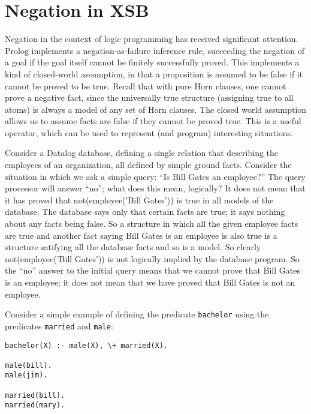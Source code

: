 \chapter{Negation in XSB}

Negation in the context of logic programming has received significant
attention.  Prolog implements a negation-as-failure inference rule,
succeeding the negation of a goal if the goal itself cannot be
finitely successfully proved.  This implements a kind of closed-world
assumption, in that a proposition is assumed to be false if it cannot
be proved to be true.  Recall that with pure Horn clauses, one cannot
prove a negative fact, since the universally true structure (assigning
true to all atoms) is always a model of any set of Horn clauses.  The
closed world assumption allows us to assume facts are false if they
cannot be proved true.  This is a useful operator, which can be used
to represent (and program) interesting situations.

Consider a Datalog database, defining a single relation that
describing the employees of an organization, all defined by simple
ground facts.  Consider the situation in which we ask a simple query:
``Is Bill Gates an employee?''  The query processor will answer
``no''; what does this mean, logically?  It does not mean that it has
proved that not(employee('Bill Gates')) is true in all models of the
database.  The database says only that certain facts are true; it says
nothing about any facts being false.  So a structure in which all the
given employee facts are true and another fact saying Bill Gates is an
employee is also true is a structure satifying all the database facts
and so is a model.  So clearly not(employee('Bill Gates')) is not
logically implied by the database program.  So the ``no'' answer to
the initial query means that we cannot prove that Bill Gates is an
employee; it does not mean that we have proved that Bill Gates is not
an employee.

Consider a simple example of defining the predicate \verb|bachelor|
using the predicates \verb|married| and \verb|male|:

\begin{verbatim}
bachelor(X) :- male(X), \+ married(X).

male(bill).
male(jim).

married(bill).
married(mary).
\end{verbatim}

